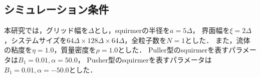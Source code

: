 \subsection{シミュレーション条件}
本研究では，グリッド幅を$\Delta$とし，squirmerの半径を$a = 5 \Delta$，
界面幅を$\xi = 2 \Delta$，システムサイズを$64 \Delta \times 128 \Delta \times 64 \Delta$，全粒子数を$N = 1$とした．
また，流体の粘度を$\eta = 1.0$，質量密度を$\rho = 1.0$とした．
Puller型のsquirmerを表すパラメータは$B_1 = 0.01, \alpha = 50.0$，
Pusher型のsquirmerを表すパラメータは$B_1 = 0.01, \alpha = -50.0$とした．
